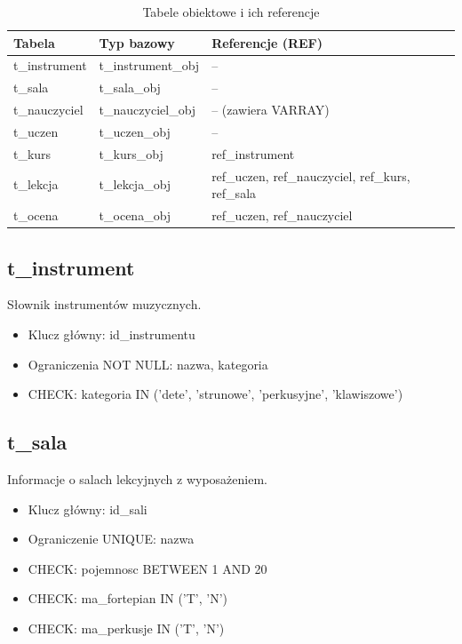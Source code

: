 \documentclass[12pt,a4paper]{article}
\begin{document}
\begin{table}[h]
\centering
\begin{tabular}{|l|l|l|}
\hline
\textbf{Tabela} & \textbf{Typ bazowy} & \textbf{Referencje (REF)} \\
\hline
t\_instrument & t\_instrument\_obj & -- \\
t\_sala & t\_sala\_obj & -- \\
t\_nauczyciel & t\_nauczyciel\_obj & -- (zawiera VARRAY) \\
t\_uczen & t\_uczen\_obj & -- \\
t\_kurs & t\_kurs\_obj & ref\_instrument \\
t\_lekcja & t\_lekcja\_obj & ref\_uczen, ref\_nauczyciel, ref\_kurs, ref\_sala \\
t\_ocena & t\_ocena\_obj & ref\_uczen, ref\_nauczyciel \\
\hline
\end{tabular}
\caption{Tabele obiektowe i ich referencje}
\end{table}

\subsection{t\_instrument}

Słownik instrumentów muzycznych.

\begin{itemize}[nosep]
    \item Klucz główny: id\_instrumentu
    \item Ograniczenia NOT NULL: nazwa, kategoria
    \item CHECK: kategoria IN ('dete', 'strunowe', 'perkusyjne', 'klawiszowe')
\end{itemize}

\subsection{t\_sala}

Informacje o salach lekcyjnych z wyposażeniem.

\begin{itemize}[nosep]
    \item Klucz główny: id\_sali
    \item Ograniczenie UNIQUE: nazwa
    \item CHECK: pojemnosc BETWEEN 1 AND 20
    \item CHECK: ma\_fortepian IN ('T', 'N')
    \item CHECK: ma\_perkusje IN ('T', 'N')
\end{itemize}
\end{document}
